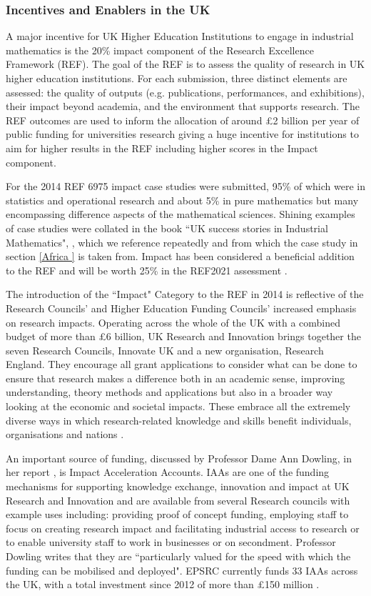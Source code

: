 \documentclass[11pt]{article} %
\begin{document}
\subsubsection{Incentives and Enablers in the UK} 
A major incentive for UK Higher Education Institutions to engage in industrial mathematics is the 20\% impact component of the Research Excellence Framework (REF). The goal of the REF is to assess the quality of research in UK higher education institutions. For each submission, three distinct elements are assessed: the quality of outputs (e.g. publications, performances, and exhibitions), their impact beyond academia, and the environment that supports research. The REF outcomes are used to inform the allocation of around £2 billion per year of public funding for universities research giving a huge  incentive for institutions to aim for higher results in the REF including higher scores in the Impact component.

 For the 2014 REF 6975 impact case studies were submitted, 95\% of which were in statistics and operational research and about 5\% in pure mathematics but many encompassing difference aspects of the mathematical sciences. Shining examples of case studies were collated in the book ``UK success stories in Industrial Mathematics", \cite{Aston2016},  which we reference repeatedly and from which the case study in section \ref{Africa } is taken from. Impact has been considered a beneficial addition to the REF and will be worth 25\% in the REF2021 assessment \cite{REF2017}.

The introduction of the ``Impact" Category to the REF in 2014 is reflective of the Research Councils' and Higher Education Funding Councils' increased emphasis on research impacts. Operating across the whole of the UK with a combined budget of more than £6 billion, UK Research and Innovation brings together the seven Research Councils, Innovate UK and a new organisation, Research England. They encourage all grant applications to consider  what can be done to ensure that research makes a difference both in an academic sense, improving understanding, theory methods and applications but also in a broader way looking at the economic and societal impacts. These embrace all the extremely diverse ways in which research-related knowledge and skills benefit individuals, organisations and nations \cite{UKRI}. 
 
An important source of funding, discussed by Professor Dame Ann Dowling, in her report \cite{DOWLING2015}, is Impact Acceleration Accounts. IAAs are one of the funding mechanisms for supporting knowledge exchange, innovation and impact at UK Research and Innovation and are available from several Research councils with example uses including: providing proof of concept funding, employing staff to focus on creating research impact and facilitating industrial access to research or to enable university staff to work in businesses or on secondment. Professor Dowling writes that they are ``particularly valued for the speed with which the funding can be mobilised and deployed".  EPSRC currently funds 33 IAAs across the UK, with a total investment since 2012 of more than £150 million \cite{IAA}.
		
\end{document}
